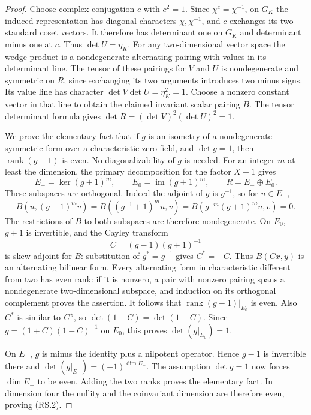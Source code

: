\begin{proof}
Choose complex conjugation $c$ with $c^2=1$.
Since $\chi^c=\chi^{-1}$, on $G_K$ the induced
representation has diagonal characters $\chi,\chi^{-1}$,
and $c$ exchanges its two standard coset vectors.
It therefore has determinant one on $G_K$ and determinant
minus one at $c$.  Thus $\det U=\eta_K$.
For any two-dimensional vector space the wedge product is a
nondegenerate alternating pairing with values in its determinant
line.  The tensor of these pairings for $V$ and $U$ is
nondegenerate and symmetric on $R$, since exchanging its two
arguments introduces two minus signs.  Its value line has
character $\det V\det U=\eta_K^2=1$.
Choose a nonzero constant vector in that line to obtain the
claimed invariant scalar pairing $B$.
The tensor determinant formula gives
$\det R=(\det V)^2(\det U)^2=1$.

We prove the elementary fact that if $g$ is an isometry of a
nondegenerate symmetric form over a characteristic-zero field,
and $\det g=1$, then $\operatorname{rank}(g-1)$ is even.
No diagonalizability of $g$ is needed.
For an integer $m$ at least the dimension, the primary
decomposition for the factor $X+1$ gives
\[
 E_-=\ker(g+1)^m,\qquad E_0=\operatorname{im}(g+1)^m,
 \qquad R=E_-\oplus E_0.
                                                        \tag{RS.3}
\]
These subspaces are orthogonal.  Indeed the adjoint of $g$
is $g^{-1}$, so for $u\in E_-$,
\[
 B(u,(g+1)^m v)
       =B((g^{-1}+1)^m u,v)
       =B(g^{-m}(g+1)^m u,v)=0.
\]
The restrictions of $B$ to both subspaces are therefore
nondegenerate.  On $E_0$, $g+1$ is invertible, and the
Cayley transform
\[
                     C=(g-1)(g+1)^{-1}
\]
is skew-adjoint for $B$: substitution of $g^*=g^{-1}$
gives $C^*=-C$.
Thus $B(Cx,y)$ is an alternating bilinear form.
Every alternating form in characteristic different from two
has even rank: if it is nonzero, a pair with nonzero pairing
spans a nondegenerate two-dimensional subspace, and induction
on its orthogonal complement proves the assertion.
It follows that $\operatorname{rank}(g-1)|_{E_0}$ is even.
Also $C^*$ is similar to $C^{\rm t}$, so
$\det(1+C)=\det(1-C)$.
Since $g=(1+C)(1-C)^{-1}$ on $E_0$, this proves
$\det(g|_{E_0})=1$.

On $E_-$, $g$ is minus the identity plus a nilpotent
operator.  Hence $g-1$ is invertible there and
$\det(g|_{E_-})=(-1)^{\dim E_-}$.
The assumption $\det g=1$ now forces $\dim E_-$ to be even.
Adding the two ranks proves the elementary fact.
In dimension four the nullity and the coinvariant dimension
are therefore even, proving (RS.2).


\end{proof}
